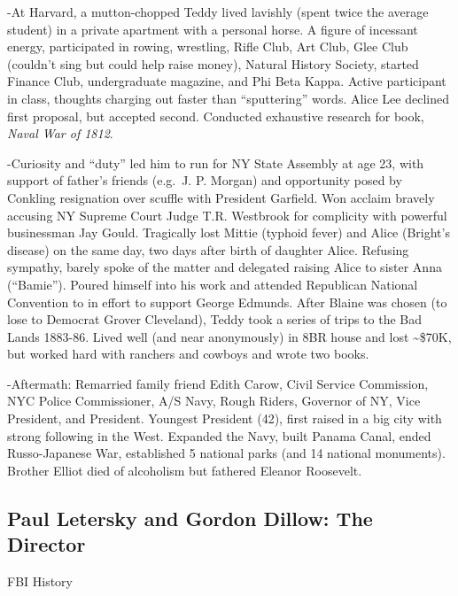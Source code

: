 \documentclass[
]{article}
\begin{document}
-At Harvard, a mutton-chopped Teddy lived lavishly (spent twice the
average student) in a private apartment with a personal horse. A figure
of incessant energy, participated in rowing, wrestling, Rifle Club, Art
Club, Glee Club (couldn't sing but could help raise money), Natural
History Society, started Finance Club, undergraduate magazine, and Phi
Beta Kappa. Active participant in class, thoughts charging out faster
than ``sputtering'' words. Alice Lee declined first proposal, but
accepted second. Conducted exhaustive research for book, \emph{Naval War
of 1812}.

-Curiosity and ``duty'' led him to run for NY State Assembly at age 23,
with support of father's friends (e.g.~J. P. Morgan) and opportunity
posed by Conkling resignation over scuffle with President Garfield. Won
acclaim bravely accusing NY Supreme Court Judge T.R. Westbrook for
complicity with powerful businessman Jay Gould. Tragically lost Mittie
(typhoid fever) and Alice (Bright's disease) on the same day, two days
after birth of daughter Alice. Refusing sympathy, barely spoke of the
matter and delegated raising Alice to sister Anna (``Bamie''). Poured
himself into his work and attended Republican National Convention to in
effort to support George Edmunds. After Blaine was chosen (to lose to
Democrat Grover Cleveland), Teddy took a series of trips to the Bad
Lands 1883-86. Lived well (and near anonymously) in 8BR house and lost
\textasciitilde\$70K, but worked hard with ranchers and cowboys and
wrote two books.

-Aftermath: Remarried family friend Edith Carow, Civil Service
Commission, NYC Police Commissioner, A/S Navy, Rough Riders, Governor of
NY, Vice President, and President. Youngest President (42), first raised
in a big city with strong following in the West. Expanded the Navy,
built Panama Canal, ended Russo-Japanese War, established 5 national
parks (and 14 national monuments). Brother Elliot died of alcoholism but
fathered Eleanor Roosevelt.

\hypertarget{paul-letersky-and-gordon-dillow-the-director}{%
\subsection{Paul Letersky and Gordon Dillow: The
Director}\label{paul-letersky-and-gordon-dillow-the-director}}

FBI History
\end{document}
